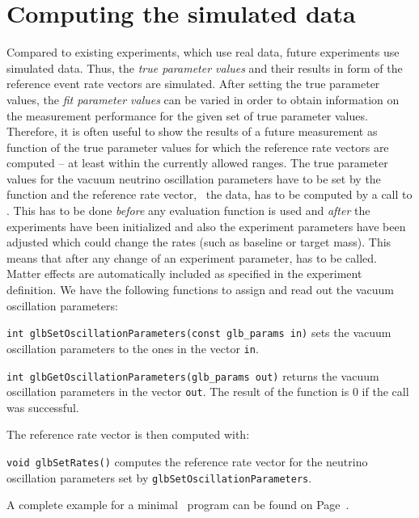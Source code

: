 \section{Computing the simulated data}

Compared to existing experiments, which use real data, future experiments
use simulated data. Thus, the {\em true parameter values} and their results in 
form of the reference event rate vectors are simulated. After setting the 
true parameter values, the {\em fit parameter values} can be varied in order to 
obtain information on the measurement performance for the given set of true 
parameter values. Therefore, it is often useful to show the results of a 
future measurement as function of the true parameter values for which the 
reference rate vectors are computed -- at least within the currently allowed 
ranges. The true parameter values for the vacuum neutrino oscillation 
parameters have to be set by the function  
and the reference rate vector, \ie\ the data, has to be computed by a call 
to .
This has to be done {\em before} any evaluation 
function is used and  {\em after} the experiments have been initialized and 
also the experiment 
parameters have been adjusted which could change the rates (such as baseline
 or target mass). This means that
after any change of an experiment parameter,  has to be 
called. Matter effects are automatically included as specified in the 
experiment definition. We have the following functions to assign and
read out the vacuum oscillation parameters:
\begin{function}
{\tt int glbSetOscillationParameters(const glb\_params in)} sets the
vacuum oscillation parameters to the ones in the vector {\tt in}.
\end{function}
\begin{function}
{\tt int glbGetOscillationParameters(glb\_params out)} returns the
vacuum oscillation parameters in the vector {\tt out}. The result of
the function is $0$ if the call was successful.
\end{function}
The reference rate vector is then computed with:
\begin{function}
{\tt void glbSetRates()} computes the reference rate vector for the neutrino oscillation parameters set by {\tt glbSetOscillationParameters}. 
\end{function}
A complete example for a minimal \GLOBES\ program can be found on
Page~\pageref{ex:c}.

